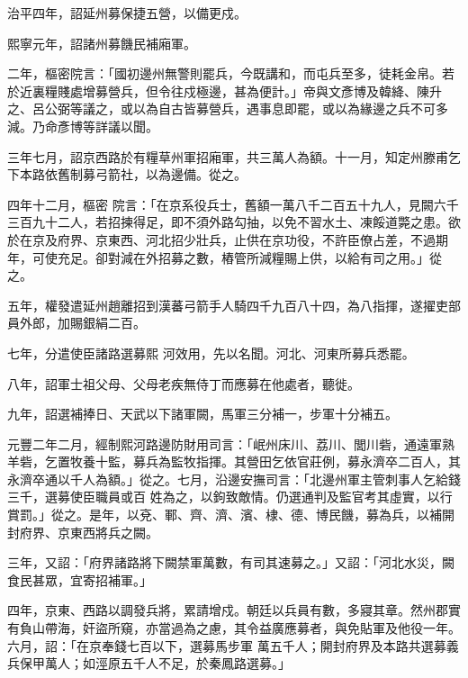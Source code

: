 \begin{pinyinscope}
 治平四年，詔延州募保捷五營，以備更戍。



 熙寧元年，詔諸州募饑民補廂軍。



 二年，樞密院言：「國初邊州無警則罷兵，今既講和，而屯兵至多，徒耗金帛。若於近裏糧賤處增募營兵，但令往戍極邊，甚為便計。」帝與文彥博及韓絳、陳升之、呂公弼等議之，或以為自古皆募營兵，遇事息即罷，或以為緣邊之兵不可多減。乃命彥博等詳議以聞。



 三年七月，詔京西路於有糧草州軍招廂軍，共三萬人為額。十一月，知定州滕甫乞下本路依舊制募弓箭社，以為邊備。從之。



 四年十二月，樞密
 院言：「在京系役兵士，舊額一萬八千二百五十九人，見闕六千三百九十二人，若招揀得足，即不須外路勾抽，以免不習水土、凍餒道斃之患。欲於在京及府界、京東西、河北招少壯兵，止供在京功役，不許臣僚占差，不過期年，可使充足。卻對減在外招募之數，樁管所減糧賜上供，以給有司之用。」從之。



 五年，權發遣延州趙離招到漢蕃弓箭手人騎四千九百八十四，為八指揮，遂擢吏部員外郎，加賜銀絹二百。



 七年，分遣使臣諸路選募熙
 河效用，先以名聞。河北、河東所募兵悉罷。



 八年，詔軍士祖父母、父母老疾無侍丁而應募在他處者，聽徙。



 九年，詔選補捧日、天武以下諸軍闕，馬軍三分補一，步軍十分補五。



 元豐二年二月，經制熙河路邊防財用司言：「岷州床川、荔川、閭川砦，通遠軍熟羊砦，乞置牧養十監，募兵為監牧指揮。其營田乞依官莊例，募永濟卒二百人，其永濟卒通以千人為額。」從之。七月，沿邊安撫司言：「北邊州軍主管刺事人乞給錢三千，選募使臣職員或百
 姓為之，以鉤致敵情。仍選通判及監官考其虛實，以行賞罰。」從之。是年，以兗、鄆、齊、濟、濱、棣、德、博民饑，募為兵，以補開封府界、京東西將兵之闕。



 三年，又詔：「府界諸路將下闕禁軍萬數，有司其速募之。」又詔：「河北水災，闕食民甚眾，宜寄招補軍。」



 四年，京東、西路以調發兵將，累請增戍。朝廷以兵員有數，多寢其章。然州郡實有負山帶海，奸盜所窺，亦當過為之慮，其令益廣應募者，與免貼軍及他役一年。六月，詔：「在京奉錢七百以下，選募馬步軍
 萬五千人；開封府界及本路共選募義兵保甲萬人；如涇原五千人不足，於秦鳳路選募。」




\end{pinyinscope}
